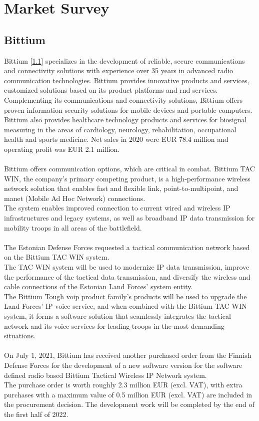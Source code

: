 \section{Market Survey}
\subsection{Bittium}
Bittium [\ref{}] specializes in the development of reliable, secure communications and connectivity solutions with experience over 35 years in advanced radio communication technologies. Bittium provides innovative products and services, customized solutions based on its product platforms and \acrfull{rnd} services. Complementing its communications and connectivity solutions, Bittium offers proven information security solutions for mobile devices and portable computers. Bittium also provides healthcare technology products and services for biosignal measuring in the areas of cardiology, neurology, rehabilitation, occupational health and sports medicine. Net sales in 2020 were EUR 78.4 million and operating profit was EUR 2.1 million.
\\
\\
Bittium offers communication options, which are critical in combat. Bittium TAC WIN, the company's primary competing product, is a high-performance wireless network solution that enables fast and flexible link, point-to-multipoint, and \acrshort{manet} (Mobile Ad Hoc Network) connections.
\\
The system enables improved connection to current wired and wireless IP infrastructures and legacy systems, as well as broadband IP data transmission for mobility troops in all areas of the battlefield. 
\\
\\
The Estonian Defense Forces requested a tactical communication network based on the Bittium TAC WIN system.
\\
The TAC WIN system will be used to modernize IP data transmission, improve the performance of the tactical data transmission, and diversify the wireless and cable connections of the Estonian Land Forces' system entity.
\\
The Bittium Tough \acrfull{voip} product family's products will be used to upgrade the Land Forces' IP voice service, and when combined with the Bittium TAC WIN system, it forms a software solution that seamlessly integrates the tactical network and its voice services for leading troops in the most demanding situations.
\\
\\
On July 1, 2021, Bittium has received another purchased order from the Finnish Defense Forces for the development of a new software version for the software defined radio based Bittium Tactical Wireless IP Network system.
\\
The purchase order is worth roughly 2.3 million EUR (excl. VAT), with extra purchases with a maximum value of 0.5 million EUR (excl. VAT) are included in the procurement decision.
The development work will be completed by the end of the first half of 2022.
